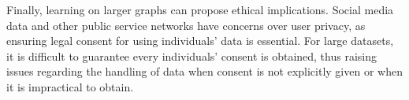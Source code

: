 Finally, learning on larger graphs can 
propose ethical implications. Social media data
and other public service networks have
concerns over user privacy, as ensuring legal
consent for using individuals' data is essential.
For large datasets, it is difficult to guarantee
every individuals' consent is obtained, thus
raising issues regarding the handling of data
when consent is not explicitly given or when it is
impractical to obtain. 

